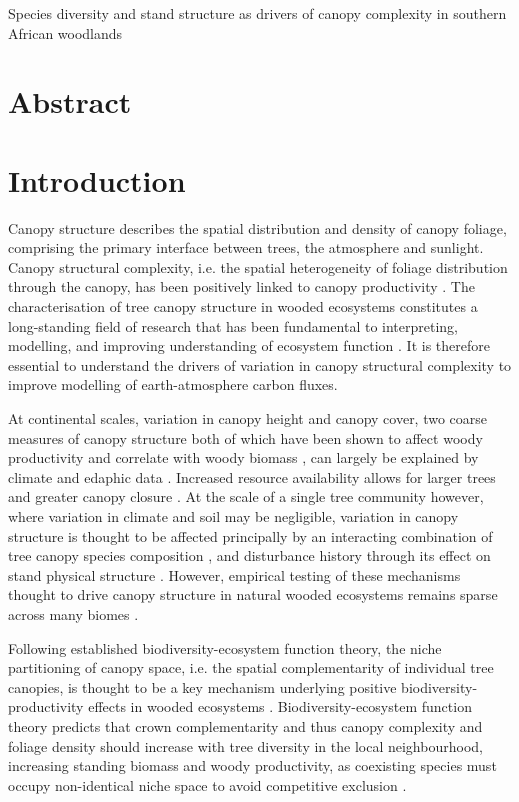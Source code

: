 \documentclass[11pt,a4paper]{article}
\newcommand{\titletext}{Species diversity and stand structure as drivers of canopy complexity in southern African woodlands}
\begin{document}
{\LARGE{\titletext{}}}

\linenumbers

\section*{Abstract}

\section{Introduction}

Canopy structure describes the spatial distribution and density of canopy foliage, comprising the primary interface between trees, the atmosphere and sunlight. Canopy structural complexity, i.e. the spatial heterogeneity of foliage distribution through the canopy, has been positively linked to canopy productivity \citep{Hardiman2011,Chen2012,Law2001,Baldocchi2001,Morin2015}. The characterisation of tree canopy structure in wooded ecosystems constitutes a long-standing field of research that has been fundamental to interpreting, modelling, and improving understanding of ecosystem function \citep{Watt1947, Whittaker1969, Horn1971, Maarel1996}. It is therefore essential to understand the drivers of variation in canopy structural complexity to improve modelling of earth-atmosphere carbon fluxes.

At continental scales, variation in canopy height and canopy cover, two coarse measures of canopy structure both of which have been shown to affect woody productivity and correlate with woody biomass \citep{}, can largely be explained by climate and edaphic data \citep{GEDI}. Increased resource availability allows for larger trees and greater canopy closure \citep{}. At the scale of a single tree community however, where variation in climate and soil may be negligible, variation in canopy structure is thought to be affected principally by an interacting combination of tree canopy species composition \citep{}, and disturbance history through its effect on stand physical structure \citep{}. However, empirical testing of these mechanisms thought to drive canopy structure in natural wooded ecosystems remains sparse across many biomes \citep{}.

Following established biodiversity-ecosystem function theory, the niche partitioning of canopy space, i.e. the spatial complementarity of individual tree canopies, is thought to be a key mechanism underlying positive biodiversity-productivity effects in wooded ecosystems \citep{Pretzsch2014, Barry2019}. Biodiversity-ecosystem function theory predicts that crown complementarity and thus canopy complexity and foliage density should increase with tree diversity in the local neighbourhood, increasing standing biomass and woody productivity, as coexisting species must occupy non-identical niche space to avoid competitive exclusion \citep{}.
\end{document}
